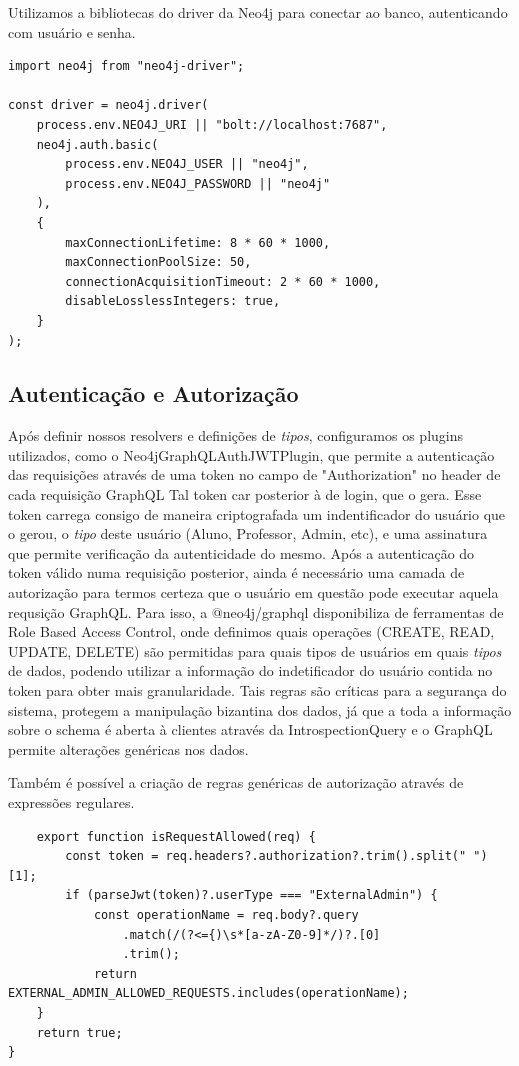 Utilizamos a bibliotecas do driver da Neo4j para conectar ao banco, autenticando com usuário e senha.

\begin{lstlisting}
import neo4j from "neo4j-driver";

const driver = neo4j.driver(
	process.env.NEO4J_URI || "bolt://localhost:7687",
	neo4j.auth.basic(
		process.env.NEO4J_USER || "neo4j",
		process.env.NEO4J_PASSWORD || "neo4j"
	),
	{
		maxConnectionLifetime: 8 * 60 * 1000,
		maxConnectionPoolSize: 50,
		connectionAcquisitionTimeout: 2 * 60 * 1000,
		disableLosslessIntegers: true,
	}
);
\end{lstlisting}

\subsection{Autenticação e Autorização}

Após definir nossos resolvers e definições de \textit{tipos}, configuramos os plugins utilizados, como o Neo4jGraphQLAuthJWTPlugin, que permite a autenticação das requisições através de uma token no campo de "Authorization" no header de cada requisição GraphQL Tal token car posterior à de login, que o gera. Esse token carrega consigo de maneira criptografada um indentificador do usuário que o gerou, o \textit{tipo} deste usuário (Aluno, Professor, Admin, etc), e uma assinatura que permite verificação da autenticidade do mesmo.
Após a autenticação do token válido numa requisição posterior, ainda é necessário uma camada de autorização para termos certeza que o usuário em questão pode executar aquela requsição GraphQL. Para isso, a @neo4j/graphql disponibiliza de ferramentas de Role Based Access Control, onde definimos quais operações (CREATE, READ, UPDATE, DELETE) são permitidas para quais tipos de usuários em quais \textit{tipos} de dados, podendo utilizar a informação do indetificador do usuário contida no token para obter mais granularidade. Tais regras são críticas para a segurança do sistema, protegem a manipulação bizantina dos dados, já que a toda a informação sobre o schema é aberta à clientes através da IntrospectionQuery e o GraphQL permite alterações genéricas nos dados.

Também é possível a criação de regras genéricas de autorização através de expressões regulares.

\begin{lstlisting}
    export function isRequestAllowed(req) {
    	const token = req.headers?.authorization?.trim().split(" ")[1];
    	if (parseJwt(token)?.userType === "ExternalAdmin") {
    		const operationName = req.body?.query
    			.match(/(?<={)\s*[a-zA-Z0-9]*/)?.[0]
    			.trim();
    		return EXTERNAL_ADMIN_ALLOWED_REQUESTS.includes(operationName);
	}
	return true;
}
\end{lstlisting}

